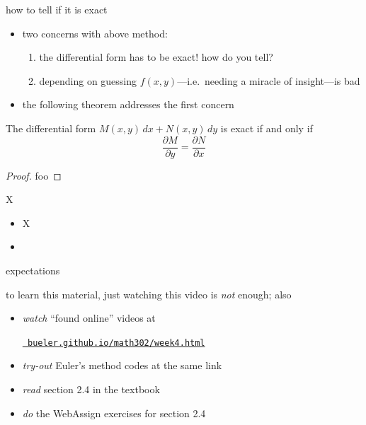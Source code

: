\documentclass{beamer}
\begin{document}
\begin{frame}{how to tell if it is exact}

\begin{itemize}
\item two concerns with above method:
    \begin{enumerate}
    \item the differential form has to be exact!  how do you tell?
    \item depending on guessing $f(x,y)$---i.e.~needing a miracle of insight---is bad
    \end{enumerate}
\item the following theorem addresses the first concern
\end{itemize}

\begin{theorem}
The differential form $M(x,y)\,dx + N(x,y)\,dy$ is exact if and only if
    $$\frac{\partial M}{\partial y} = \frac{\partial N}{\partial x}$$
\end{theorem}

\begin{proof}
foo
\end{proof}
\end{frame}

\begin{frame}{X}

\begin{itemize}
\item X
\item 
\end{itemize}
\end{frame}

\begin{frame}{expectations}

to learn this material, just watching this video is \emph{not} enough; also
\begin{itemize}
\item \emph{watch} ``found online'' videos at

\centerline{\href{https://bueler.github.io/math302/week4.html}{\tt \color{cyan} bueler.github.io/math302/week4.html}}
\item \emph{try-out} Euler's method codes at the same link
\item \emph{read} section 2.4 in the textbook
\item \emph{do} the WebAssign exercises for section 2.4
\end{itemize}
\end{frame}
\end{document}
